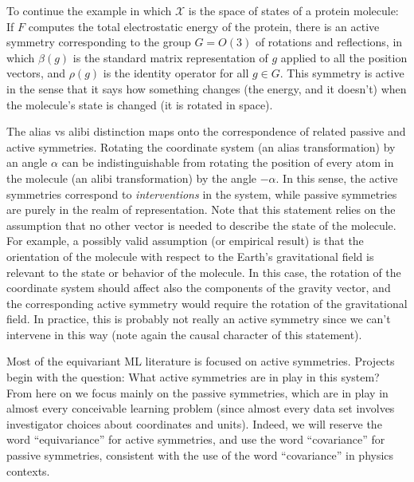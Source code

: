 \documentclass{article} %
\renewcommand{\mathcal}[1]{\mathscr{#1}} %
\begin{document}
To continue the example in which $\mathcal{X}$ is the space of states of a protein molecule:
If $F$ computes the total electrostatic energy of the protein, there is an active symmetry corresponding to the group $G=O(3)$ of rotations and reflections, in which $\beta(g)$ is the standard matrix representation of $g$ applied to all the position vectors, and $\rho(g)$ is the identity operator for all $g\in G$.
This symmetry is active in the sense that it says how something changes (the energy, and it doesn't) when the molecule's state is changed (it is rotated in space).

The alias vs alibi distinction maps onto the correspondence of related passive and active symmetries.
Rotating the coordinate system (an alias transformation) by an angle $\alpha$ can be indistinguishable from rotating the position of every atom in the molecule (an alibi transformation) by the angle $-\alpha$. 
In this sense, the active symmetries correspond to \emph{interventions} in the system, while passive symmetries are purely in the realm of representation.
Note that this statement relies on the assumption that no other vector is needed to describe the state of the molecule. 
For example, a possibly valid assumption (or empirical result) is that the orientation of the molecule with respect to the Earth's gravitational field is relevant to the state or behavior of the molecule. 
In this case, the rotation of the coordinate system should affect also the components of the gravity vector, and the corresponding active symmetry would require the rotation of the gravitational field.
In practice, this is probably not really an active symmetry since we can't intervene in this way (note again the causal character of this statement).

Most of the equivariant ML literature is focused on active symmetries.
Projects begin with the question: What active symmetries are in play in this system?
From here on we focus mainly on the passive symmetries, which are in play in almost every conceivable learning problem (since almost every data set involves investigator choices about coordinates and units).
Indeed, we will reserve the word ``equivariance'' for active symmetries, and use the word ``covariance'' for passive symmetries, consistent with the use of the word ``covariance'' in physics contexts.
\end{document}
